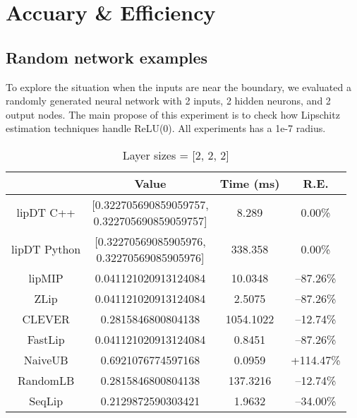 \documentclass[11pt]{article}
\begin{document}
\section{Accuary \& Efficiency}

\subsection{Random network examples}

To explore the situation when the inputs are near the boundary, we evaluated a randomly generated neural network with 2 inputs, 2 hidden neurons, and 2 output nodes. The main propose of this experiment is to check how Lipschitz estimation techniques handle ReLU(0). All experiments has a 1e-7 radius.

\begin{table}[H]
\centering
\caption{Layer sizes = [2, 2, 2]}
\begin{tabular}{|c|c|c|c|}
\hline
                & Value                              & Time (ms)      & R.E. \\ \hline
lipDT C++ &  \makecell*[c]{[0.322705690859059757,\\ 0.322705690859059757]} & 8.289 & 0.00\%    \\ \hline
lipDT Python &  \makecell*[c]{[0.32270569085905976,\\ 0.32270569085905976]} & 338.358 & 0.00\%    \\ \hline
lipMIP          & 0.041121020913124084               & 10.0348   & --87.26\% \\ \hline
ZLip            & 0.041121020913124084               & 2.5075    & --87.26\%\\ \hline
CLEVER          & 0.2815846800804138				 & 1054.1022 & --12.74\%\\ \hline
FastLip         & 0.041121020913124084				 & 0.8451    & --87.26\% \\ \hline
NaiveUB         & 0.6921076774597168				 & 0.0959    & +114.47\% \\ \hline
RandomLB        & 0.2815846800804138				 & 137.3216  & --12.74\% \\ \hline
SeqLip          & 0.2129872590303421                                                                                                  & 1.9632 &   --34.00\%  \\ \hline
\end{tabular}
\label{table:random1}
\end{table}
\end{document}
